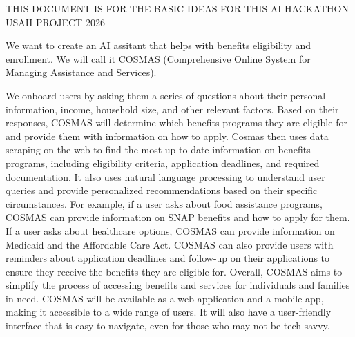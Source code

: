 THIS DOCUMENT IS FOR THE BASIC IDEAS FOR THIS AI HACKATHON USAII PROJECT 2026

We want to create an AI assitant that helps with benefits eligibility and enrollment. We will call it COSMAS (Comprehensive Online System for Managing Assistance and Services).

We onboard users by asking them a series of questions about their personal information, income, household size, and other relevant factors. Based on their responses, COSMAS will determine which benefits programs they are eligible for and provide them with information on how to apply.    
Cosmas then uses data scraping on the web to find the most up-to-date information on benefits programs, including eligibility criteria, application deadlines, and required documentation. It also uses natural language processing to understand user queries and provide personalized recommendations based on their specific circumstances. For example, if a user asks about food assistance programs, COSMAS can provide information on SNAP benefits and how to apply for them. If a user asks about healthcare options, COSMAS can provide information   on Medicaid and the Affordable Care Act. COSMAS can also provide users with reminders about application deadlines and follow-up on their applications to ensure they receive the benefits they are eligible for. Overall, COSMAS aims to simplify the process of accessing benefits and services for individuals and families in need.      
COSMAS will be available as a web application and a mobile app, making it accessible to a wide range of users. It will also have a user-friendly interface that is easy to navigate, even for those who may not be tech-savvy.                  



